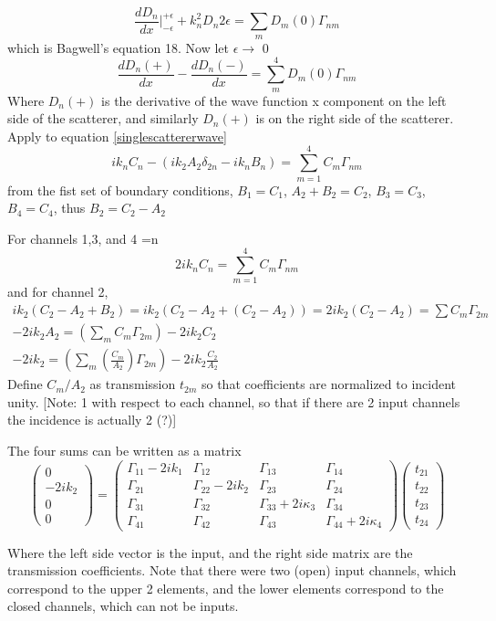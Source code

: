 \begin{equation}
\frac{dD_n}{dx}|^{+\epsilon}_{-\epsilon} + k_n^2 D_n 2 \epsilon = 
\sum_m D_m(0) \Gamma_{nm}
\end{equation}
which is Bagwell's equation 18. Now let $\epsilon \rightarrow$ 0
\begin{equation}
\frac{dD_n(+)}{dx} - \frac{dD_n(-)}{dx} = \sum_m^4 D_m(0) \Gamma_{nm}
\end{equation}
Where $D_{n}(+)$ is the derivative of the wave function x component on the left side of the scatterer, and similarly $D_{n}(+)$ is on the right side of the scatterer. Apply to equation \ref{singlescattererwave}
\begin{equation}
i k_n C_n - (i k_2 A_2 \delta_{2 n} - i k_n B_n) = 
\sum_{m=1}^4 C_m \Gamma_{nm}
\end{equation}
from the fist set of boundary conditions, $B_1=C_1$, $A_2+B_2=C_2$, $B_3=C_3$, $B_4=C_4$, thus $B_2=C_2-A_2$

For channels 1,3, and 4 =n
\begin{equation}
2 i k_n C_n = \sum_{m=1}^4 C_m \Gamma_{nm}
\end{equation}
and for channel 2,
\begin{equation}
\begin{gathered}
i k_2 (C_2 - A_2 +B_2) = i k_2 (C_2 -A_2 + (C_2 - A_2)) = 2 i k_2 (C_2 -A_2) = \sum C_m \Gamma_{2m} \\
-2 i k_2 A_2 = (\sum_m C_m \Gamma_{2m}) - 2 i k_2 C_2 \\
-2 i k_2 = (\sum_m (\frac{C_m}{A_2}) \Gamma_{2m}) - 2 i k_2 \frac{C_2}{A_2}
\end{gathered}
\end{equation}
Define $C_m/A_2$ as transmission $t_{2m}$ so that coefficients are normalized to incident unity. [Note: 1 with respect to each channel, so that if there are 2 input channels the incidence is actually 2 (?)]

The four sums can be written as a matrix
\begin{equation}
 \left( \begin{array}{c}
0 \\
-2 i k_2 \\
0 \\
0  \end{array} \right) =
 \left( \begin{array}{cccc}
\Gamma_{11}-2 i k_1 & \Gamma_{12}         & \Gamma_{13}              & \Gamma_{14} \\
\Gamma_{21}         & \Gamma_{22}-2 i k_2 & \Gamma_{23}              & \Gamma_{24} \\
\Gamma_{31}         & \Gamma_{32}         & \Gamma_{33}+2 i \kappa_3 & \Gamma_{34} \\
\Gamma_{41}         & \Gamma_{42}         & \Gamma_{43}              & \Gamma_{44}+2 i \kappa_4 \end{array} \right)
 \left( \begin{array}{c}
t_21 \\
t_22 \\
t_23 \\
t_24 \end{array} \right) 
\end{equation}

Where the left side vector is the input, and the right side matrix are the transmission coefficients. Note that there were two (open) input channels, which correspond to the upper 2 elements, and the lower elements correspond to the closed channels, which can not be inputs.